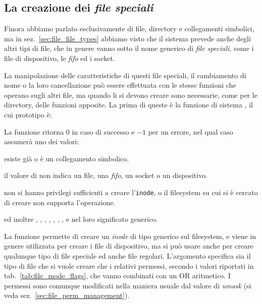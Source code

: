 

\subsection{La creazione dei \textsl{file speciali}}
\label{sec:file_mknod}


Finora abbiamo parlato esclusivamente di file, directory e collegamenti
simbolici, ma in sez.~\ref{sec:file_file_types} abbiamo visto che il sistema
prevede anche degli altri tipi di file, che in genere vanno sotto il nome
generico di \textsl{file speciali}, come i file di dispositivo, le
\textit{fifo} ed i socket.

La manipolazione delle caratteristiche di questi file speciali, il cambiamento
di nome o la loro cancellazione può essere effettuata con le stesse funzioni
che operano sugli altri file, ma quando li si devono creare sono necessarie,
come per le directory, delle funzioni apposite. La prima di queste è la
funzione di sistema , il cui prototipo è:

\begin{funcproto}{
}
{La funzione ritorna $0$ in caso di successo e $-1$ per un errore, nel qual
  caso  assumerà uno dei valori: 
  \begin{errlist}
  \item[\errcode{EEXIST}]  esiste già o è un collegamento
    simbolico. 
  \item[\errcode{EINVAL}] il valore di  non indica un file, una
    \textit{fifo}, un socket o un dispositivo.
  \item[\errcode{EPERM}] non si hanno privilegi sufficienti a creare
    l'\texttt{inode}, o il filesystem su cui si è cercato di
    creare  non supporta l'operazione.
  \end{errlist}
  ed inoltre , , ,
  , , , ,
   e  nel loro significato generico.}
\end{funcproto}

La funzione permette di creare un \textit{inode} di tipo generico sul
filesystem, e viene in genere utilizzata per creare i file di dispositivo, ma
si può usare anche per creare qualunque tipo di file speciale ed anche file
regolari. L'argomento  specifica sia il tipo di file che si vuole
creare che i relativi permessi, secondo i valori riportati in
tab.~\ref{tab:file_mode_flags}, che vanno combinati con un OR aritmetico. I
permessi sono comunque modificati nella maniera usuale dal valore di
\textit{umask} (si veda sez.~\ref{sec:file_perm_management}).

